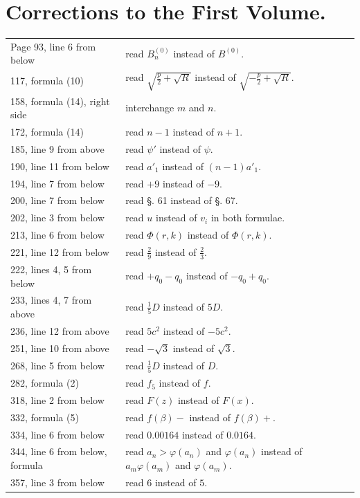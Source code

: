 \documentclass[11pt]{article}
\begin{document}
\section*{Corrections to the First Volume.}
\begin{longtable}{p{}p{}}
Page 93, line 6 from below & read $B_n^{(0)}$ instead of $B^{(0)}$.\\
117, formula (10) & read $\sqrt{\frac{p}{2}+\sqrt{R}}$ instead of $\sqrt{-\frac{p}{2}+\sqrt{R}}$.\\
158, formula (14), right side & interchange $m$ and $n$.\\
172, formula (14) & read $n-1$ instead of $n+1$.\\
185, line 9 from above & read $\psi'$ instead of $\psi$.\\
190, line 11 from below & read $a'_1$ instead of $(n-1)a'_1$.\\
194, line 7 from below & read $+9$ instead of $-9$.\\
200, line 7 from below & read §. 61 instead of §. 67.\\
202, line 3 from below & read $u$ instead of $v_i$ in both formulae.\\
213, line 6 from below & read $\Phi(r,k)$ instead of $\Phi(r,k)$.\\
221, line 12 from below & read $\frac{2}{9}$ instead of $\frac{2}{3}$.\\
222, lines 4, 5 from below & read $+q_0-q_0$ instead of $-q_0+q_0$.\\
233, lines 4, 7 from above & read $\frac{1}{5}D$ instead of $5D$.\\
236, line 12 from above & read $5c^2$ instead of $-5c^2$.\\
251, line 10 from above & read $-\sqrt{3}$ instead of $\sqrt{3}$.\\
268, line 5 from below & read $\frac{1}{5}D$ instead of $D$.\\
282, formula (2) & read $f_5$ instead of $f$.\\
318, line 2 from below & read $F(z)$ instead of $F(x)$.\\
332, formula (5) & read $f(\beta)-$ instead of $f(\beta)+$.\\
334, line 6 from below & read $0.00164$ instead of $0.0164$.\\
344, line 6 from below, formula & read $a_n>\varphi(a_n)$ and $\varphi(a_n)$ instead of $a_m\varphi(a_m)$ and $\varphi(a_m)$.\\
357, line 3 from below & read $6$ instead of $5$.\\

\end{longtable}
\end{document}
